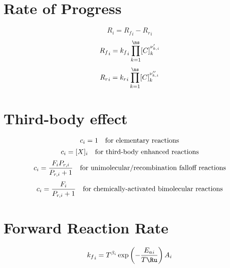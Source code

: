 \documentclass[a4paper,10pt]{article}
\begin{document}
\section{Rate of Progress}
\begin{dmath} R_{i} = {R_f}_{i} - {R_r}_{i}\end{dmath} 
\begin{dmath} {R_f}_{i} = {k_f}_{i} \prod_{k=1}^{\ns} [C]_{k}^{\nu^{\prime}_{k,i}}\end{dmath} 
\begin{dmath} {R_r}_{i} = {k_r}_{i} \prod_{k=1}^{\ns} [C]_{k}^{\nu^{\prime\prime}_{k,i}}\end{dmath} 
\section{Third-body effect}
\begin{dmath} c_{i}=1\text{\quad for elementary reactions}\end{dmath} 
\begin{dmath} c_{i}=[X]_{i}\text{\quad for third-body enhanced reactions}\end{dmath} 
\begin{dmath} c_{i}=\frac{F_{i} P_{r, i}}{P_{r, i} + 1}\text{\quad for unimolecular/recombination falloff reactions}\end{dmath} 
\begin{dmath} c_{i}=\frac{F_{i}}{P_{r, i} + 1}\text{\quad for chemically-activated bimolecular reactions}\end{dmath} 
\section{Forward Reaction Rate}
\begin{dmath} {k_f}_{i} = T^{\beta_{i}} \operatorname{exp}\left({- \frac{{E_{a}}_{i}}{T \Ru}}\right) A_{i}\end{dmath} 
\end{document}
